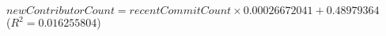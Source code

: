 $\mathit{newContributorCount} = \mathit{recentCommitCount} \times 0.00026672041 + 0.48979364$\\($R^2 = 0.016255804$)